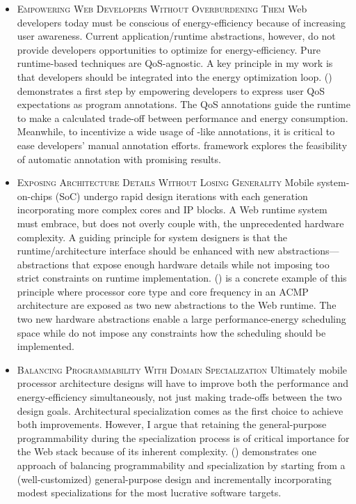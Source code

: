 \begin{itemize}
  \item \textsc{Empowering Web Developers Without Overburdening Them} Web developers today must be conscious of energy-efficiency because of increasing user awareness. Current application/runtime abstractions, however, do not provide developers opportunities to optimize for energy-efficiency. Pure runtime-based techniques are QoS-agnostic. A key principle in my work is that developers should be integrated into the energy optimization loop. \greenweb () demonstrates a first step by empowering developers to express user QoS expectations as program annotations. The QoS annotations guide the runtime to make a calculated trade-off between performance and energy consumption. Meanwhile, to incentivize a wide usage of \greenweb-like annotations, it is critical to ease developers' manual annotation efforts. \autogreen framework explores the feasibility of automatic annotation with promising results.
  
  \item \textsc{Exposing Architecture Details Without Losing Generality} Mobile system-on-chips (SoC) undergo rapid design iterations with each generation incorporating more complex cores and IP blocks. A Web runtime system must embrace, but does not overly couple with, the unprecedented hardware complexity. A guiding principle for system designers is that the runtime/architecture interface should be enhanced with new abstractions---abstractions that expose enough hardware details while not imposing too strict constraints on runtime implementation. \webrt () is a concrete example of this principle where processor core type and core frequency in an ACMP architecture are exposed as two new abstractions to the Web runtime. The two new hardware abstractions enable a large performance-energy scheduling space while do not impose any constraints how the scheduling should be implemented.
  
  \item \textsc{Balancing Programmability With Domain Specialization} Ultimately mobile processor architecture designs will have to improve both the performance and energy-efficiency simultaneously, not just making trade-offs between the two design goals. Architectural specialization comes as the first choice to achieve both improvements. However, I argue that retaining the general-purpose programmability during the specialization process is of critical importance for the Web stack because of its inherent complexity. \webcore () demonstrates one approach of balancing programmability and specialization by starting from a (well-customized) general-purpose design and incrementally incorporating modest specializations for the most lucrative software targets.
\end{itemize}

